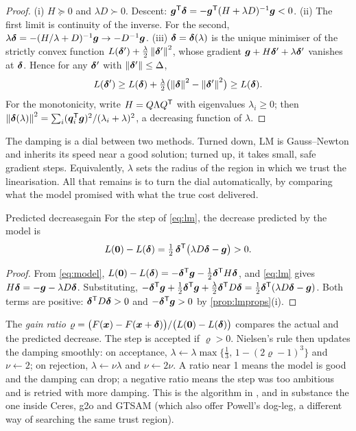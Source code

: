 \begin{proof}
(i) $H\succeq0$ and $\lambda D\succ0$. Descent:
$\bm{g}^{\mathsf{T}}\bm{\delta}=-\bm{g}^{\mathsf{T}}(H+\lambda D)^{-1}\bm{g}<0$.
(ii) The first limit is continuity of the inverse. For the second,
$\lambda\bm{\delta}=-(H/\lambda+D)^{-1}\bm{g}\to-D^{-1}\bm{g}$.
(iii) $\bm{\delta}=\bm{\delta}(\lambda)$ is the unique minimiser of the
strictly convex function $L(\bm{\delta}')+\frac\lambda2\left\lVert \bm{\delta}'\right\rVert^2$, whose gradient $\bm{g}+H\bm{\delta}'+\lambda\bm{\delta}'$
vanishes at $\bm{\delta}$. Hence for any $\bm{\delta}'$ with
$\left\lVert \bm{\delta}'\right\rVert\le\Delta$,
\[
L(\bm{\delta}')\ge L(\bm{\delta})+\tfrac\lambda2\bigl(\left\lVert \bm{\delta}\right\rVert^2-\left\lVert \bm{\delta}'\right\rVert^2\bigr)\ge L(\bm{\delta}).
\]
For the monotonicity, write $H=Q\Lambda Q^{\mathsf{T}}$ with eigenvalues
$\lambda_i\ge0$; then $\left\lVert \bm{\delta}(\lambda)\right\rVert^2=\sum_i(\bm{q}_i^{\mathsf{T}}
\bm{g})^2/(\lambda_i+\lambda)^2$, a decreasing function of $\lambda$.
\end{proof}

\begin{inwords}
The damping is a dial between two methods. Turned down, LM is
Gauss--Newton and inherits its speed near a good solution; turned up, it
takes small, safe gradient steps. Equivalently, $\lambda$ sets the radius
of the region in which we trust the linearisation. All that remains is
to turn the dial automatically, by comparing what the model promised with
what the true cost delivered.
\end{inwords}

\begin{lemma}{Predicted decrease}{gain}
For the step of \eqref{eq:lm}, the decrease predicted by the model is
\[
L(\bm{0})-L(\bm{\delta})=\tfrac12\,\bm{\delta}^{\mathsf{T}}\bigl(\lambda D\bm{\delta}
-\bm{g}\bigr)>0 .
\]
\end{lemma}

\begin{proof}
From \eqref{eq:model}, $L(\bm{0})-L(\bm{\delta})=-\bm{\delta}^{\mathsf{T}}\bm{g}-
\tfrac12\bm{\delta}^{\mathsf{T}} H\bm{\delta}$, and \eqref{eq:lm} gives
$H\bm{\delta}=-\bm{g}-\lambda D\bm{\delta}$. Substituting,
$-\bm{\delta}^{\mathsf{T}}\bm{g}+\tfrac12\bm{\delta}^{\mathsf{T}}\bm{g}+\tfrac\lambda2
\bm{\delta}^{\mathsf{T}} D\bm{\delta}=\tfrac12\bm{\delta}^{\mathsf{T}}(\lambda D\bm{\delta}-
\bm{g})$. Both terms are positive: $\bm{\delta}^{\mathsf{T}} D\bm{\delta}>0$ and
$-\bm{\delta}^{\mathsf{T}}\bm{g}>0$ by \cref{prop:lmprops}(i).
\end{proof}

The \emph{gain ratio}
$\varrho=\bigl(F(\bm{x})-F(\bm{x}+\bm{\delta})\bigr)/\bigl(L(\bm{0})-L(\bm{\delta})\bigr)$ compares the actual and the predicted decrease. The step
is accepted if $\varrho>0$. Nielsen's rule then updates the damping
smoothly: on acceptance, $\lambda\leftarrow\lambda\max\{\tfrac13,\,1-
(2\varrho-1)^3\}$ and $\nu\leftarrow2$; on rejection,
$\lambda\leftarrow\nu\lambda$ and $\nu\leftarrow2\nu$. A ratio near 1
means the model is good and the damping can drop; a negative ratio
means the step was too ambitious and is retried with more damping. This
is the algorithm in , and in substance
the one inside Ceres, g2o and GTSAM (which also offer Powell's dog-leg, a
different way of searching the same trust region).

